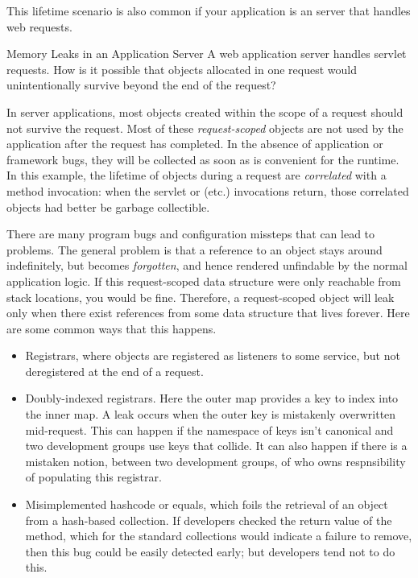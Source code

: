 This lifetime scenario is also common if your application is an
server that handles web requests.

\begin{example}{Memory Leaks in an Application Server}
	A web application server handles servlet requests. How is it possible that
	objects allocated in one request would unintentionally survive beyond the end
	of the request?
\end{example} 
  
In server applications, most
objects created within the scope of a request should not survive the
request. Most of these \emph{request-scoped}
 objects are not used by the application after the
request has completed. In the absence of application or framework bugs, they will
be collected as soon as is convenient for the runtime. In this example, the
lifetime of objects during a request are \emph{correlated} with a method
invocation: when the servlet  or  (etc.) invocations
return, those correlated objects had better be garbage collectible.

There are many program bugs and configuration missteps that can lead to
problems. The general problem is that a reference to an object stays around
indefinitely, but becomes
\emph{forgotten}, and hence rendered unfindable by the normal application
logic. If this request-scoped data structure were only reachable from stack
locations, you would be fine. Therefore, a request-scoped object will leak only
when there exist references from some data structure that lives forever. Here
are some common ways that this happens.

\begin{itemize}
  \item Registrars, where objects are registered as listeners to some service,
  but not deregistered at the end of a request.
  \item Doubly-indexed registrars. Here the outer map provides a key to index
  into the inner map. A leak occurs when the outer key is mistakenly
  overwritten mid-request. This can happen if the namespace of keys isn't
  canonical and two development groups use keys that collide. It can also
  happen if there is a mistaken notion, between two development groups, of who
  owns respnsibility of populating this registrar.
  \item Misimplemented hashcode or equals, which foils the retrieval of an
  object from a hash-based collection. If developers checked the return value of
  the  method, which for the standard collections would indicate a failure to remove, then
  this bug could be easily detected early; but developers tend not to do this.
\end{itemize}

